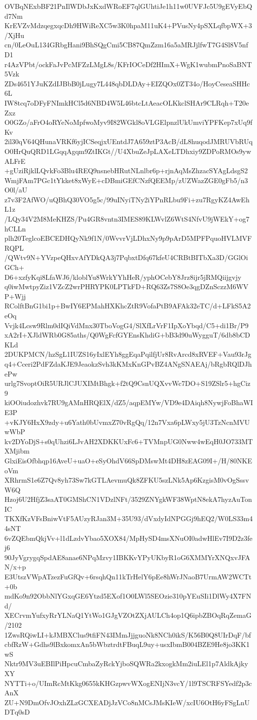 OVBqNExbBF21PnIlWDbJxKxdWRoEF7qlGUhtiJe1h11w0UVFJc5U9gEVyEbQd7Nm
KrEVZvMdzqegxqcDh9HWiReXC5w3K0hpaM11uK4+PVusNy4pSXLqfbpWX+3/XjHu
cn/0LeOuL134GRbgHani9BhSQgCmi5CB87QmZzm16a5aMRJjlfwT7G4Sl8V5nfD1
r4AzVPbt/ockFaJvPcMFZzLMgL8s/KFrIOCeDf2HImX+WgK1wubmPnoSaBNT5Vzk
ZDs4651YJuKZdIJBbB0jLugy7L448qbDLDAy+EIZQOx0ZT34o/HoyCeseaSHHc6L
IW8tcq7oDFyFNImkHCl5d6NBD4W5L46btcLtAeacOLKkclSHAr9CLRqh+T20eZxz
O0GZo/aFrO4oRYeNoMpfwoMyv9I82WGkl8oVLGElpnzlUkUmviYPFKep7xUq9fKv
2il30qV64QHunaVRKf6yjICSeqjxUEntdJ7A659ztP3AcB/dL8huqodJMRUVbRUq
O0HrQuQRD1LGqqAgqm9ZtIKGt//U4XbuZeJpLAXeLTDhxiy9ZDPoRMOs9ywALFrE
+gUziRjklLQvkFo3Blu4REQ9nsnebHRutNLnlbr6p+rjnAqMsZhzacSYAgLdsgS2
WmjFAm7PGc1tYkket8xWyE+cDBmiGEfCNzfQEEMp/zUZWazZGE0gFb5/n3O0l/aU
z7v3F2AfWO/uQBhQ30VO5g5c/99uINyiTNy2iYPnRLbu9Fi+zu7RgyKZ4AwEhL1z
/LQy34V2M8MeKHZS/Pu4GR8vntn3IMES89KLWvlZ6WtS4NfvU9jWEkY+og7hCLLn
plh20TeglcoEBCEDHQyNk9f1N/0WvvrVjLDhxNy9p9pArD5MPFPquoHVLMVFRQPL
/QWtv9N+YVzpeQHxvAfYDkQA3j7PqbxtDfq67kfeU4CRBtBITbXa3D/GGlOiGCh+
D6+xzfyKqi8LfaWJ6/kloblYu8WrkYYhHeR/yphOCebY8Jrz8ijr5jRMQiijgvjy
q0iwMwtpyZiz1VZcZ2wrPHRYPK0LPTkFD+RQ63Zs7S8Oe3qgDZnSczzM6WVP+Wjj
RColftBnG1bi1p+BwIY6EPMahHXKhcZtR9VofaPtB9AFAk32eTC/d+LFkS5A2eOq
Vvjk4Lcsw9Rlm0dIQiVdMnx30TboVogG4/SlXfLrVrF1IpXoYbqd/C5+di1Br/P9
xA2rI+XJldWRb0G85aths/Q0WgFcfGYEnsKhdiG+bB3d90uWygguT/6db8bCDKLd
2DUKPMCN/hzSgL1IUZS16yIxlEYh8ggEqaPqilfjUr8RvArcd8xRVEF+Vau93rJg
q4+Cceri2PdFZdaKJE9JeaokzSvh3kKMxKnGPvBZ4ANgSNAEAj/bRgbRQlDJhePw
urlg7SvoptOiR5URJlCJUXIMtBhgk+f2tQ9CsnUQXvvWc7DO+S19ZSlr5+hgCiz9
kiOOiudozhvk7RU9gAMnHRQElX/dZ5/aqpEMYw/VD9e4DAiqh8NywjFoBhaWIE3P
+vKJY6HxX9zdy+u6Yath0bUvmxZ70vRgQq/12n7Vxa6pLWxy5jU3TzNcnMVUwWbP
kv2DYoDjS+s0qUhzi6LJvAH2XDKKUxFc6+TVMnpUG0Nww4wEqH0JO733MTXMjibm
GlxiEisOfbhqp16AveU+uaO+eSyOhdV66SpDMswMt4DH8zEAG09I+/H/80NKEoVm
XRhrmS1e6Z7Qv8yh73Sw7kGTLAevmuQk8ZFKU5szLNk5Ap6KzgisM0vOgSssvW6Q
Hzoj6U2HfjZ3saAT0GMShCN1VDzlNFt/3529ZNYgkWF38WptN8ekA7hyzAuTonIC
TKXfKzVFsBniwVtF5AUzyRJan3M+35U93/dVxdyIdNPGGj9hEQ2/W0LS33m44sNT
6vZQEbmQkjVv+l1dLzdvYbao5XOX84/MpHySD4msXNuOI0adwHlEv7I9D2z3fej6
90JyVgrygqSpdAE8anae6NPqMzvy1IBKKvYPyUKbyR1oG6XMMYrXNQxvJFAN/x+p
E3UtszVWpATzezFuGfQv+6rsqhQn11kTrHelY6pEe8hWrJNaoB7UrmAW2WCTt+0b
mdKo9n92ObbNlYGxqGE6Ytzd5EXof1O0LWl5SEOzie310pYEuSIi1DlWy4X7FNd/
XECrvmYufxyRrYLNaQ1YtWo1GJgVZOtZXjAULCh4op1Q6ipbZBOqRqZemaG/2102
1ZwsRQiwLI+kJMBXClus9tfiFN43IMmJjjguoNk8NCh0ikS/K56B0Q8UIrDqF/bf
cbfRzW+Gdhs9lBxkomxAn5bWbztrdtFBuqL9uy+usxIbmB004BZE9He8jo3KK1wS
Nktr9MV3uEBIlPiHpcuCmbaZyRckYjboSQWRa2kxogkMm2iuLEl1p7AldkAjkyXY
NYTTi+o/UImRcMtKkg0655kKHGzpwvWXogENIjN3vcY/1l9TSCRFSYedf2p3cAnX
ZU+N9DmOfvJOxhZLzGCXEADjJzVCo8nMCsJMsKIeW/xcIU6OtH6yFSgLnUDTq0sD
